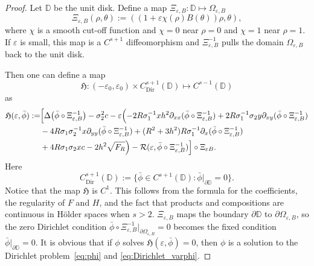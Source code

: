 \documentclass[12pt,reqno]{amsart}
\numberwithin{equation}{section}
\theoremstyle{definition}
\theoremstyle{remark}
\begin{document}
\begin{proof}
	Let $ \mathbb{D}$ be the unit disk. Define a map $ \Xi_{\varepsilon,B}:\mathbb{D}\mapsto \varOmega_{\varepsilon, B} $
	\begin{equation*}%
	\Xi_{\varepsilon,B}(\rho,\theta):=((1+\varepsilon\chi(\rho)B(\theta))\rho,\theta),
	\end{equation*}
	where $\chi$ is a smooth cut-off function and $\chi=0$ near $\rho=0$ and $\chi=1$ near $\rho=1$.  If $\varepsilon $ is small, this map is a $C^{s+1}$ diffeomorphism and $ \Xi_{\varepsilon,B}^{-1}  $ pulls the domain $\varOmega_{\varepsilon, B}$ back to the unit disk.  

Then one can define a map
\[
	\mathfrak H : (-\varepsilon_0,\varepsilon_0) \times C^{s+1}_{\text{Dir}}(\mathbb{D}) \mapsto C^{s-1}(\mathbb{D})
\]
as
\begin{equation*} 
\begin{split}
	\mathfrak H(\varepsilon,\bar\phi) :=&
\Bigl[ \Delta\bigl( \bar\phi \circ \Xi_{\varepsilon,B}^{-1} \bigr)
- \sigma_2^2c-\varepsilon\Bigl(-2R\sigma_1^{-1}xh^2\partial_{xx}(\bar\phi \circ \Xi_{\varepsilon,B}^{-1})+2  R\sigma_1^{-1}\sigma_2y\partial_{xy}(\bar\phi \circ \Xi_{\varepsilon,B}^{-1})\\
&-4R\sigma_1\sigma_2^{-1}x\partial_{yy}(\bar\phi \circ \Xi_{\varepsilon,B}^{-1})+(R^2+3h^2)R\sigma_1^{-1}\partial_x(\bar\phi \circ \Xi_{\varepsilon,B}^{-1})\\
&
+4R \sigma_1\sigma_2xc-2h^2\sqrt{F_R}\Bigr)
-\mathcal{R}(\varepsilon,\bar\phi \circ \Xi_{\varepsilon,B}^{-1}) \Bigr] \circ \Xi_{\varepsilon B} .
\end{split}
\end{equation*}
Here
\[
C^{s+1}_{\mathrm{Dir}}(\mathbb{D}) :=
\bigl\{ \bar\phi \in C^{s+1}(\mathbb{D}) : \bar\phi|_{\partial \mathbb{D}}=0 \bigr\} .
\]
Notice that the map $\mathfrak H$ is $C^1$.  This follows from the formula for the coefficients, the regularity of $F$ and $H$, and the fact that products and compositions are continuous in H\"older spaces when $s>2$. $ \Xi_{\varepsilon,B}  $ maps the boundary $\partial\mathbb{D} $   to $\partial\varOmega_{\varepsilon, B}$, so the zero Dirichlet condition $ \bar\phi\circ\Xi_{\varepsilon,B}^{-1}|_{\partial\varOmega_{\varepsilon, B}}=0 $ becomes the fixed condition $\bar\phi|_{\partial \mathbb{D} }=0$. 
It is obvious that if $\phi$ solves $\mathfrak H(\varepsilon,\bar\phi)=0$, then $\phi$ is a solution to the Dirichlet problem~\eqref{eq:phi} and \eqref{eq:Dirichlet_varphi}.


\end{proof}
\end{document}
